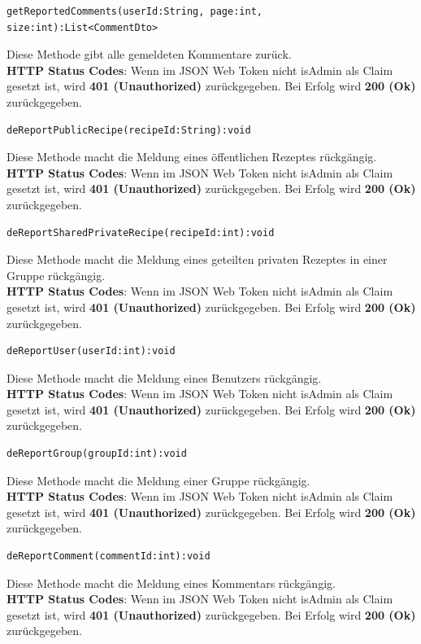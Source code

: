  \begin{lstlisting}
getReportedComments(userId:String, page:int, size:int):List<CommentDto>
\end{lstlisting}
Diese Methode gibt alle gemeldeten Kommentare zurück.\\
\textbf{HTTP Status Codes}:
Wenn im JSON Web Token nicht isAdmin als Claim gesetzt ist, wird \textbf{401 (Unauthorized)} zurückgegeben. Bei Erfolg wird \textbf{200 (Ok)} zurückgegeben.
\vspace{1cm}
\begin{lstlisting}
deReportPublicRecipe(recipeId:String):void
\end{lstlisting}
Diese Methode macht die Meldung eines öffentlichen Rezeptes rückgängig.\\
\textbf{HTTP Status Codes}:
Wenn im JSON Web Token nicht isAdmin als Claim gesetzt ist, wird \textbf{401 (Unauthorized)} zurückgegeben. Bei Erfolg wird \textbf{200 (Ok)} zurückgegeben.
\vspace{1cm}
\begin{lstlisting}
deReportSharedPrivateRecipe(recipeId:int):void
\end{lstlisting}
Diese Methode macht die Meldung eines geteilten privaten Rezeptes in einer Gruppe rückgängig.\\
\textbf{HTTP Status Codes}:
Wenn im JSON Web Token nicht isAdmin als Claim gesetzt ist, wird \textbf{401 (Unauthorized)} zurückgegeben. Bei Erfolg wird \textbf{200 (Ok)} zurückgegeben.
\vspace{1cm}
\begin{lstlisting}
deReportUser(userId:int):void
\end{lstlisting}
Diese Methode macht die Meldung eines Benutzers rückgängig.\\
\textbf{HTTP Status Codes}:
Wenn im JSON Web Token nicht isAdmin als Claim gesetzt ist, wird \textbf{401 (Unauthorized)} zurückgegeben. Bei Erfolg wird \textbf{200 (Ok)} zurückgegeben.
\vspace{1cm}
\begin{lstlisting}
deReportGroup(groupId:int):void
\end{lstlisting}
Diese Methode macht die Meldung einer Gruppe rückgängig.\\
\textbf{HTTP Status Codes}:
Wenn im JSON Web Token nicht isAdmin als Claim gesetzt ist, wird \textbf{401 (Unauthorized)} zurückgegeben. Bei Erfolg wird \textbf{200 (Ok)} zurückgegeben.
\vspace{1cm}
\begin{lstlisting}
deReportComment(commentId:int):void
\end{lstlisting}
Diese Methode macht die Meldung eines Kommentars rückgängig.\\
\textbf{HTTP Status Codes}:
Wenn im JSON Web Token nicht isAdmin als Claim gesetzt ist, wird \textbf{401 (Unauthorized)} zurückgegeben. Bei Erfolg wird \textbf{200 (Ok)} zurückgegeben.
\vspace{1cm}

